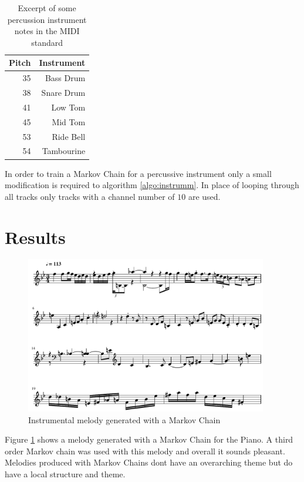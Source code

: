\begin{table}[htbp]
  \centering
  \caption{Excerpt of some percussion instrument notes in the \ac{MIDI} standard}
    \begin{tabular}{r|r}
    \toprule
    Pitch & Instrument\\
    \midrule
    35    & Bass Drum \\
    38    & Snare Drum \\
    41    & Low Tom \\
    45    & Mid Tom \\
    53    & Ride Bell \\
    54    & Tambourine \\
    \bottomrule
    \end{tabular}%
  \label{tab:percuspitchesexcerpt}%
\end{table}%

In order to train a Markov Chain for a percussive instrument only a small modification is required to algorithm \ref{algo:instrumm}. In place of looping through all tracks only tracks with a channel number of $10$ are used.

\section{Results}
\begin{figure}
\centerline{\includegraphics[width=400px]{../images/instrumental_acousticgrand.pdf}}
\caption{Instrumental melody generated with a Markov Chain}
\label{ims:instrumentalmc}
\end{figure}

Figure \ref{ims:instrumentalmc} shows a melody generated with a Markov Chain for the Piano. A third order Markov chain was used with this melody and overall it sounds pleasant. Melodies produced with Markov Chains dont have an overarching theme but do have a local structure and theme.

